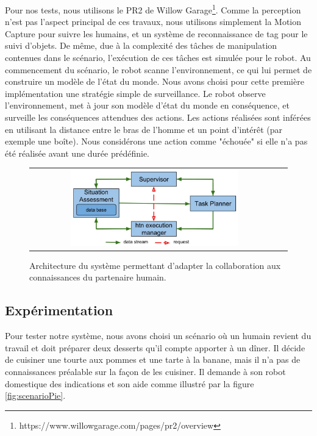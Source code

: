 \documentclass[a4paper,11pt,twoside]{StyleThese}
\begin{document}
Pour nos tests, nous utilisons le PR2 de Willow Garage\footnote{https://www.willowgarage.com/pages/pr2/overview}. Comme la perception n'est pas l'aspect principal de ces travaux, nous utilisons simplement la Motion Capture pour suivre les humains, et un système de reconnaissance de tag pour le suivi d'objets.
De même, due à la complexité des tâches de manipulation contenues dans le scénario, l'exécution de ces tâches est simulée pour le robot.
Au commencement du scénario, le robot scanne l'environnement, ce qui lui permet de construire un modèle de l'état du monde.
Nous avons choisi pour cette première implémentation une stratégie simple de surveillance. Le robot observe l'environnement, met à jour son modèle d'état du monde en conséquence, et surveille les conséquences attendues des actions. Les actions réalisées sont inférées en utilisant la distance entre le bras de l'homme et un point d'intérêt (par exemple une boîte). Nous considérons une action comme "échouée" si elle n'a pas été réalisée avant une durée prédéfinie.

%
%
%
\begin{figure}[ht!]

 \centering
 \begin{tabular}{cc}
  \includegraphics[width=0.69\textwidth]{img/archi.jpg}
 \end{tabular}
 \caption{Architecture du système permettant d'adapter la collaboration aux connaissances du partenaire humain.}
 \label{fig:architecture}
 \end{figure}
 
 \subsection{Expérimentation}
 \label{sec:experiment}
Pour tester notre système, nous avons choisi un scénario où un humain revient du travail et doit préparer deux desserts qu'il compte apporter à un dîner. Il décide de cuisiner une tourte aux pommes et une tarte à la banane, mais il n'a pas de connaissances préalable sur la façon de les cuisiner. Il demande à son robot domestique des indications et son aide comme illustré par la figure \ref{fig:scenarioPie}.
\end{document}
